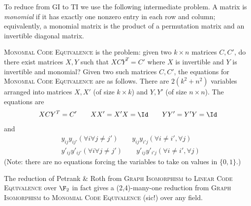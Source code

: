 To reduce from \textsc{GI} to \textsc{TI} we use the following intermediate problem. A matrix is \emph{monomial} if it has exactly one nonzero entry in each row and column; equivalently, a monomial matrix is the product of a permutation matrix and an invertible diagonal matrix. 

\begin{definition}
\textsc{Monomial Code Equivalence} is the problem: given two $k \times n$ matrices $C,C'$, do there exist matrices $X,Y$ such that $XCY^T = C'$ where $X$ is invertible and $Y$ is invertible and monomial? Given two such matrices $C,C'$, the equations for \textsc{Monomial Code Equivalence} are as follows. There are $2(k^2 + n^2)$ variables arranged into matrices $X,X'$ (of size $k \times k$) and $Y,Y'$ (of size $n \times n$). The equations are
\[
XCY^T = C' \qquad XX' = X'X =\Id \qquad YY' = Y'Y = \Id
\]
and
\begin{align*}
& y_{ij}y_{ij'} (\forall i \forall j \neq j') \qquad y_{ij} y_{i'j} (\forall i \neq i', \forall j) \\
& y'_{ij}y'_{ij'} (\forall i \forall j \neq j') \qquad y'_{ij} y'_{i'j} (\forall i \neq i', \forall j) 
\end{align*}
(Note: there are no equations forcing the variables to take on values in $\{0,1\}$.)
\end{definition}


\begin{proposition} \label{prop:GIMon}
The reduction of Petrank \& Roth \cite{PR} from \textsc{Graph Isomorphism} to \textsc{Linear Code Equivalence} over $\F_2$ in fact gives a (2,4)-many-one reduction from \textsc{Graph Isomorphism} to \textsc{Monomial Code Equivalence} (sic!) over any field.
\end{proposition}

